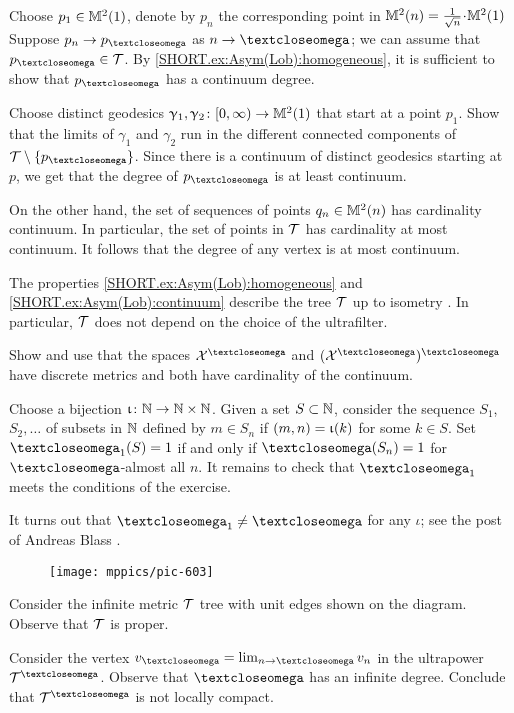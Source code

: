 Choose $p_1\in \Lob21$, denote by $p_n$ the corresponding point in $\Lob2n\z=\tfrac1{\sqrt{n}}\cdot\Lob21$
Suppose $p_n\to p_\o$ as $n\to\o$; we can assume that $p_\o\in\spc{T}$.
By \ref{SHORT.ex:Asym(Lob):homogeneous}, it is sufficient to show that $p_\o$ has a continuum degree.

Choose distinct geodesics $\gamma_1,\gamma_2\:[0,\infty)\to \Lob21$ that start at a point $p_1$.
Show that the limits of $\gamma_1$ and $\gamma_2$ run in the different connected components of $\spc{T}\setminus \{p_\o\}$.
Since there is a continuum of distinct geodesics starting at $p$,
we get that the degree of $p_\o$ is at least continuum.

On the other hand, the set of sequences of points $q_n\in\Lob2n$  has cardinality continuum.
In particular, the set of points in $\mathcal{T}$ has cardinality at most continuum.
It follows that the degree of any vertex is at most continuum.

The properties \ref{SHORT.ex:Asym(Lob):homogeneous} and \ref{SHORT.ex:Asym(Lob):continuum} describe the tree $\mathcal{T}$ up to isometry \cite{dyubina-polterovich}.
In particular, $\mathcal{T}$ does not depend on the choice of the ultrafilter.

Show and use that the spaces $\spc{X}^\o$ and $(\spc{X}^\o)^\o$ have discrete metrics and both have cardinality of the continuum.

Choose a bijection $\iota\:\NN\to \NN\times \NN$.
Given a set $S\subset \NN$, consider the sequence $S_1$, $S_2,\dots$ of subsets in $\mathbb{N}$ defined by $m\in S_n$ if $(m,n)\z=\iota(k)$ for some $k\in S$.
Set $\o_1(S)=1$ if and only if $\o(S_n)=1$ for $\o$-almost all $n$.
It remains to check that $\o_1$ meets the conditions of the exercise.

It turns out that $\o_1\ne \o$ for any $\iota$;
see the post of Andreas Blass \cite{blass}.

\begin{wrapfigure}{r}{40 mm}
\vskip-0mm
\centering
\texttt{[image: mppics/pic-603]}
\end{wrapfigure}

 Consider the infinite metric $\mathcal{T}$ tree with unit edges shown
on the diagram. Observe that $\mathcal{T}$ is proper.

Consider the vertex $v_\o=\lim_{n\to\o}v_n$ in the ultrapower $\spc{T}^\o$.
Observe that $\o$ has an infinite degree.
Conclude that $\spc{T}^\o$ is not locally compact.

